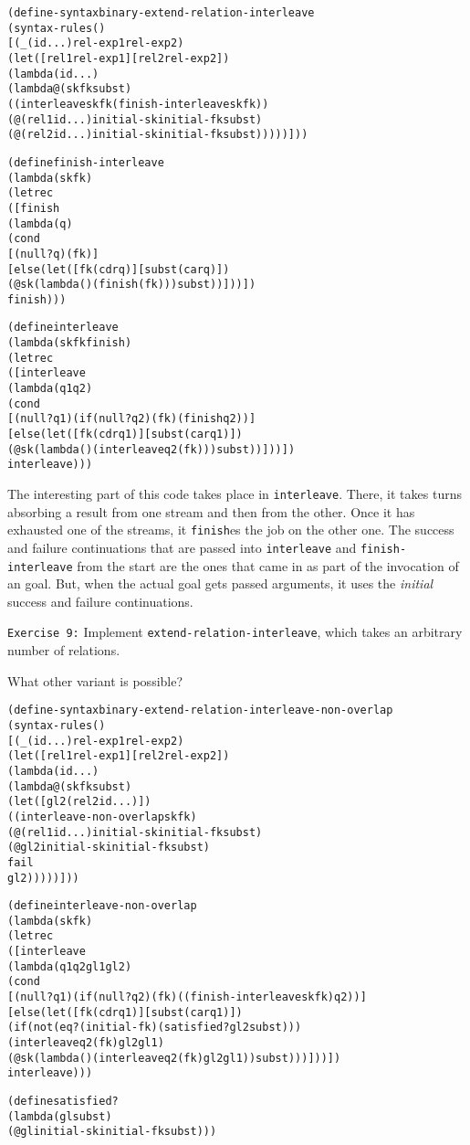 \begin{alltt}
(define-syntax binary-extend-relation-interleave
  (syntax-rules ()
    [(_ (id ...) rel-exp1 rel-exp2)
     (let ([rel1 rel-exp1] [rel2 rel-exp2])
       (lambda (id ...)
         (lambda@ (sk fk subst)
           ((interleave sk fk (finish-interleave sk fk))
            (@ (rel1 id ...) initial-sk initial-fk subst)
            (@ (rel2 id ...) initial-sk initial-fk subst)))))]))

(define finish-interleave
  (lambda (sk fk)
    (letrec
      ([finish
         (lambda (q)
           (cond
             [(null? q) (fk)]
             [else (let ([fk (cdr q)] [subst (car q)])
                     (@ sk (lambda () (finish (fk))) subst))]))])
      finish)))

(define interleave
  (lambda (sk fk finish)
    (letrec
      ([interleave
         (lambda (q1 q2)
           (cond
             [(null? q1) (if (null? q2) (fk) (finish q2))]
             [else (let ([fk (cdr q1)] [subst (car q1)])
                     (@ sk (lambda () (interleave q2 (fk))) subst))]))])
      interleave)))
\end{alltt}

The interesting part of this code takes place in \texttt{interleave}.
There, it takes turns absorbing a result from one stream and then from
the other.  Once it has exhausted one of the streams, it
\texttt{finish}es the job on the other one.  The success and failure
continuations that are passed into \texttt{interleave} and
\texttt{finish-interleave} from the start are the ones that came in as
part of the invocation of an goal.  But, when the actual
goal gets passed arguments, it uses the \emph{initial} success
and failure continuations.

\noindent
\texttt{Exercise 9:} Implement \texttt{extend-relation-interleave},
which takes an arbitrary number of relations.\endofexercise

What other variant is possible?

\begin{alltt}
(define-syntax binary-extend-relation-interleave-non-overlap
  (syntax-rules ()
    [(_ (id ...) rel-exp1 rel-exp2)
     (let ([rel1 rel-exp1] [rel2 rel-exp2])
       (lambda (id ...)
         (lambda@ (sk fk subst)
           (let ([gl2 (rel2 id ...)])
             ((interleave-non-overlap sk fk)
              (@ (rel1 id ...) initial-sk initial-fk subst)
              (@ gl2 initial-sk initial-fk subst)
              fail
              gl2)))))]))

(define interleave-non-overlap
  (lambda (sk fk)
    (letrec
      ([interleave
         (lambda (q1 q2 gl1 gl2)
           (cond
             [(null? q1) (if (null? q2) (fk) ((finish-interleave sk fk) q2))]
             [else (let ([fk (cdr q1)] [subst (car q1)])
		(if (not (eq? (initial-fk) (satisfied? gl2 subst)))
		  (interleave q2 (fk) gl2 gl1)
		  (@ sk (lambda () (interleave q2 (fk) gl2 gl1)) subst)))]))])
      interleave)))

(define satisfied?
  (lambda (gl subst)
    (@ gl initial-sk initial-fk subst)))
\end{alltt}

